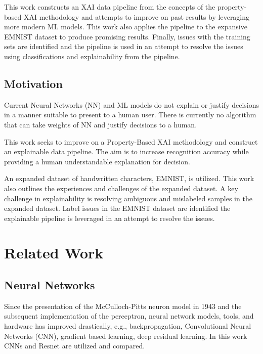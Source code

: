 \documentclass[conference]{IEEEtran}
\begin{document}
This work constructs an XAI data pipeline from the concepts of the
property-based XAI methodology and attempts to improve on past results by
leveraging more modern ML models.  This work also applies the pipeline to the
expansive EMNIST dataset to produce promising results.  Finally, issues with the
training sets are identified and the pipeline is used in an attempt to resolve
the issues using classifications and explainability from the pipeline.

\subsection{Motivation}

Current Neural Networks (NN) and ML models do not explain or justify decisions
in a manner suitable to present to a human user.  There is currently no
algorithm that can take weights of NN and justify decisions to a human.

This work seeks to improve on a Property-Based XAI methodology and construct an
explainable data pipeline. The aim is to increase recognition accuracy while
providing a human understandable explanation for decision.

An expanded dataset of handwritten characters, EMNIST, is utilized. This work
also outlines the experiences and challenges of the expanded dataset. A key
challenge in explainability is resolving ambiguous and mislabeled samples in the
expanded dataset.  Label issues in the EMNIST dataset are identified the
explainable pipeline is leveraged in an attempt to resolve the issues.

\section{Related Work}

\subsection{Neural Networks}

Since the presentation of the McCulloch-Pitts neuron
model\cite{McCulloch1943-MCCALC-5} in 1943 and the subsequent implementation of
the perceptron\cite{rosenblatt1957perceptron}, neural network models, tools, and
hardware has improved drastically, e.g., backpropagation\cite{6795724},
Convolutional Neural Networks (CNN)\cite{fukushima1982neocognitron}, gradient
based learning\cite{726791}, deep residual learning\cite{7780459}.  In this work
CNNs and Resnet are utilized and compared.
\end{document}
